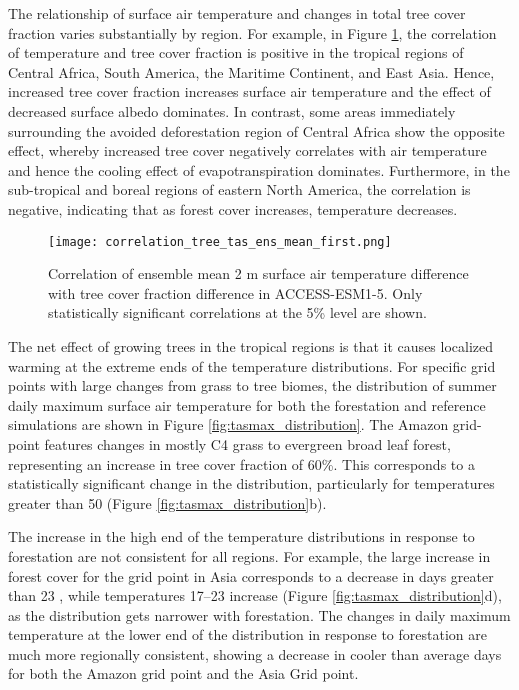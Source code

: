 \documentclass[draft]{agujournal2019}
\begin{document}
The relationship of surface air temperature and changes in total tree cover fraction varies substantially by region.
For example, in Figure \ref{fig:map_tas_tree_correlation}, the correlation of temperature and tree cover fraction is positive in the tropical regions of Central Africa, South America, the Maritime Continent, and East Asia.
Hence, increased tree cover fraction increases surface air temperature and the effect of decreased surface albedo dominates.
In contrast, some areas immediately surrounding the avoided deforestation region of Central Africa show the opposite effect, whereby increased tree cover negatively correlates with air temperature and hence the cooling effect of evapotranspiration dominates.
Furthermore, in the sub-tropical and boreal regions of eastern North America, the correlation is negative, indicating that as forest cover increases, temperature decreases.

\begin{figure}
    \texttt{[image: correlation\_tree\_tas\_ens\_mean\_first.png]}
    \caption{Correlation of ensemble mean 2 m surface air temperature difference  with  tree cover fraction difference  in ACCESS-ESM1-5. Only statistically significant correlations at the 5\% level are shown.}
    \label{fig:map_tas_tree_correlation}
\end{figure}

The net effect of growing trees in the tropical regions is that it causes localized warming at the extreme ends of the temperature distributions.
For specific grid points with large changes from grass to tree biomes, the distribution of summer daily maximum surface air temperature for both the forestation and reference simulations are shown in Figure \ref{fig:tasmax_distribution}.
The Amazon grid-point features changes in mostly C4 grass to evergreen broad leaf forest, representing an increase in tree cover fraction of 60\%.
This corresponds to a statistically significant change in the distribution, particularly for temperatures greater than 50 \textcelsius{} (Figure \ref{fig:tasmax_distribution}b).

The increase in the high end of the temperature distributions in response to forestation are not consistent for all regions.
For example, the large increase in forest cover for the grid point in Asia corresponds to a decrease in days greater than 23 \textcelsius{}, while temperatures 17--23 \textcelsius{} increase (Figure \ref{fig:tasmax_distribution}d), as the distribution gets narrower with forestation.
The changes in daily maximum temperature at the lower end of the distribution in response to forestation are much more regionally consistent, showing a decrease in cooler than average days for both the Amazon grid point and the Asia Grid point.
\end{document}
